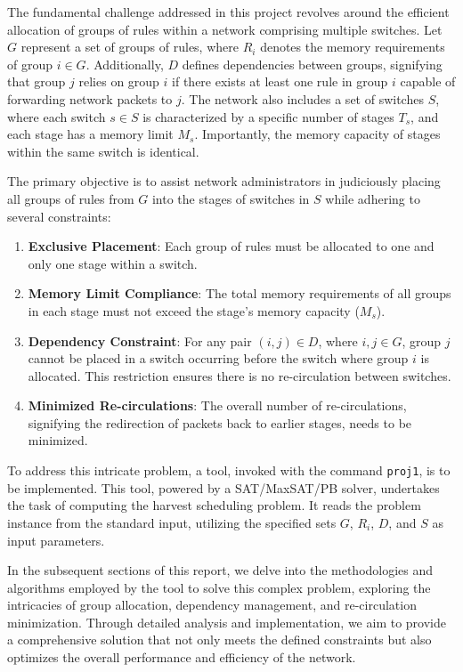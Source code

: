 The fundamental challenge addressed in this project revolves around the efficient allocation of groups of rules within a network comprising multiple switches. Let \(G\) represent a set of groups of rules, where \(R_i\) denotes the memory requirements of group \(i \in G\). Additionally, \(D\) defines dependencies between groups, signifying that group \(j\) relies on group \(i\) if there exists at least one rule in group \(i\) capable of forwarding network packets to \(j\). The network also includes a set of switches \(S\), where each switch \(s \in S\) is characterized by a specific number of stages \(T_s\), and each stage has a memory limit \(M_s\). Importantly, the memory capacity of stages within the same switch is identical.

The primary objective is to assist network administrators in judiciously placing all groups of rules from \(G\) into the stages of switches in \(S\) while adhering to several constraints:

\begin{enumerate}
    \item \textbf{Exclusive Placement}: Each group of rules must be allocated to one and only one stage within a switch.
    
    \item \textbf{Memory Limit Compliance}: The total memory requirements of all groups in each stage must not exceed the stage's memory capacity (\(M_s\)).
    
    \item \textbf{Dependency Constraint}: For any pair \((i, j) \in D\), where \(i, j \in G\), group \(j\) cannot be placed in a switch occurring before the switch where group \(i\) is allocated. This restriction ensures there is no re-circulation between switches.
    
    \item \textbf{Minimized Re-circulations}: The overall number of re-circulations, signifying the redirection of packets back to earlier stages, needs to be minimized.
\end{enumerate}

To address this intricate problem, a tool, invoked with the command \texttt{proj1}, is to be implemented. This tool, powered by a SAT/MaxSAT/PB solver, undertakes the task of computing the harvest scheduling problem. It reads the problem instance from the standard input, utilizing the specified sets \(G\), \(R_i\), \(D\), and \(S\) as input parameters.

In the subsequent sections of this report, we delve into the methodologies and algorithms employed by the tool to solve this complex problem, exploring the intricacies of group allocation, dependency management, and re-circulation minimization. Through detailed analysis and implementation, we aim to provide a comprehensive solution that not only meets the defined constraints but also optimizes the overall performance and efficiency of the network.

